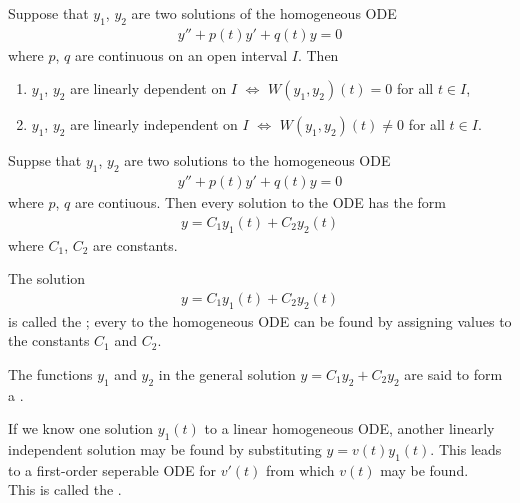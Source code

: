 \documentclass{article}
\begin{document}
\begin{theorem}
    Suppose that $y_1$, $y_2$ are two solutions of the homogeneous ODE
    \begin{align*}
        y''+p(t)y'+q(t)y =0
    \end{align*}
    where $p$, $q$ are continuous on an open interval $I$. Then
    \begin{enumerate}
        \item $y_1$, $y_2$ are linearly dependent on $I$ $\Leftrightarrow$ $W(y_1,y_2)(t)=0$ for all $t\in I$,
        \item $y_1$, $y_2$ are linearly independent on $I$ $\Leftrightarrow$ $W(y_1,y_2)(t)\not=0$ for all $t\in I$.
    \end{enumerate}
\end{theorem}
\begin{theorem}
    Suppse that $y_1$, $y_2$ are two  solutions to the
    homogeneous ODE
    \begin{align*}
        y''+p(t)y'+q(t)y =0
    \end{align*}
    where $p$, $q$ are contiuous. Then every solution to the ODE has the
    form
    \begin{align*}
        y = C_1y_1(t)+C_2y_2(t)
    \end{align*}
    where $C_1$, $C_2$ are constants.
\end{theorem}
\begin{definition}
    The solution
    \begin{align*}
        y=C_1y_1(t)+C_2y_2(t)
    \end{align*}
    is called the ; every 
    to the homogeneous ODE can be found by assigning values to the 
    constants $C_1$ and $C_2$.
\end{definition}
\begin{definition}
    The functions $y_1$ and $y_2$ in the general solution $y=C_1y_2+C_2y_2$
    are said to form a .
\end{definition}
\begin{lemma}
    If we know one solution $y_1(t)$ to a linear homogeneous ODE, another
    linearly independent solution may be found by substituting $y=v(t)y_1(t)$.
    This leads to a first-order seperable ODE for $v'(t)$ from which
    $v(t)$ may be found.\\
    This is called the .
\end{lemma}
\end{document}
